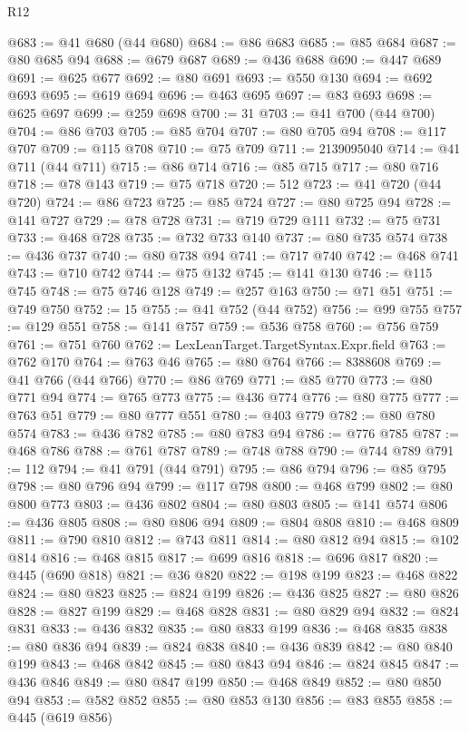 \begin{lexlean}{R12}
\begin{coremodule}
@683 := @41 @680 (@44 @680)
@684 := @86 @683
@685 := @85 @684
@687 := @80 @685 @94
@688 := @679 @687
@689 := @436 @688
@690 := @447 @689
@691 := @625 @677
@692 := @80 @691
@693 := @550 @130
@694 := @692 @693
@695 := @619 @694
@696 := @463 @695
@697 := @83 @693
@698 := @625 @697
@699 := @259 @698
@700 := 31
@703 := @41 @700 (@44 @700)
@704 := @86 @703
@705 := @85 @704
@707 := @80 @705 @94
@708 := @117 @707
@709 := @115 @708
@710 := @75 @709
@711 := 2139095040
@714 := @41 @711 (@44 @711)
@715 := @86 @714
@716 := @85 @715
@717 := @80 @716
@718 := @78 @143
@719 := @75 @718
@720 := 512
@723 := @41 @720 (@44 @720)
@724 := @86 @723
@725 := @85 @724
@727 := @80 @725 @94
@728 := @141 @727
@729 := @78 @728
@731 := @719 @729 @111
@732 := @75 @731
@733 := @468 @728
@735 := @732 @733 @140
@737 := @80 @735 @574
@738 := @436 @737
@740 := @80 @738 @94
@741 := @717 @740
@742 := @468 @741
@743 := @710 @742
@744 := @75 @132
@745 := @141 @130
@746 := @115 @745
@748 := @75 @746 @128
@749 := @257 @163
@750 := @71 @51
@751 := @749 @750
@752 := 15
@755 := @41 @752 (@44 @752)
@756 := @99 @755
@757 := @129 @551
@758 := @141 @757
@759 := @536 @758
@760 := @756 @759
@761 := @751 @760
@762 := LexLeanTarget.TargetSyntax.Expr.field
@763 := @762 @170
@764 := @763 @46
@765 := @80 @764
@766 := 8388608
@769 := @41 @766 (@44 @766)
@770 := @86 @769
@771 := @85 @770
@773 := @80 @771 @94
@774 := @765 @773
@775 := @436 @774
@776 := @80 @775
@777 := @763 @51
@779 := @80 @777 @551
@780 := @403 @779
@782 := @80 @780 @574
@783 := @436 @782
@785 := @80 @783 @94
@786 := @776 @785
@787 := @468 @786
@788 := @761 @787
@789 := @748 @788
@790 := @744 @789
@791 := 112
@794 := @41 @791 (@44 @791)
@795 := @86 @794
@796 := @85 @795
@798 := @80 @796 @94
@799 := @117 @798
@800 := @468 @799
@802 := @80 @800 @773
@803 := @436 @802
@804 := @80 @803
@805 := @141 @574
@806 := @436 @805
@808 := @80 @806 @94
@809 := @804 @808
@810 := @468 @809
@811 := @790 @810
@812 := @743 @811
@814 := @80 @812 @94
@815 := @102 @814
@816 := @468 @815
@817 := @699 @816
@818 := @696 @817
@820 := @445 (@690 @818)
@821 := @36 @820
@822 := @198 @199
@823 := @468 @822
@824 := @80 @823
@825 := @824 @199
@826 := @436 @825
@827 := @80 @826
@828 := @827 @199
@829 := @468 @828
@831 := @80 @829 @94
@832 := @824 @831
@833 := @436 @832
@835 := @80 @833 @199
@836 := @468 @835
@838 := @80 @836 @94
@839 := @824 @838
@840 := @436 @839
@842 := @80 @840 @199
@843 := @468 @842
@845 := @80 @843 @94
@846 := @824 @845
@847 := @436 @846
@849 := @80 @847 @199
@850 := @468 @849
@852 := @80 @850 @94
@853 := @582 @852
@855 := @80 @853 @130
@856 := @83 @855
@858 := @445 (@619 @856)

\end{coremodule}
\end{lexlean}
